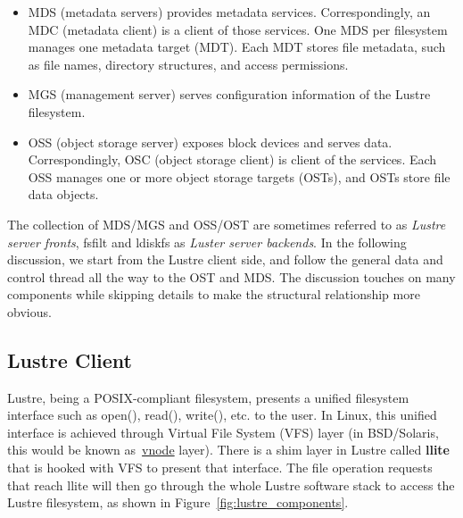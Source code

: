 %
%

\begin{itemize}

\item MDS (metadata servers) provides metadata services. Correspondingly, an
MDC (metadata client) is a client of those services. One MDS per filesystem
manages one metadata target (MDT). Each MDT stores file metadata, such as file
names, directory structures, and access permissions.

\item MGS (management server) serves configuration information of the Lustre
filesystem.

\item OSS (object storage server) exposes block devices and serves data.
Correspondingly, OSC (object storage client) is client of the services. Each
OSS manages one or more object storage targets (OSTs), and OSTs store file
data objects. 

\end{itemize}

The collection of MDS/MGS and OSS/OST are sometimes referred to as
\textit{Lustre server fronts}, fsfilt and ldiskfs as \textit{Luster server
backends}. In the following discussion, we start from the Lustre client side,
and follow the general data and control thread all the way to the OST and MDS.
The discussion touches on many components while skipping details to make the
structural relationship more obvious. 

\subsection*{Lustre Client}

Lustre, being a POSIX-compliant filesystem, presents a unified filesystem
interface such as open(), read(), write(), etc. to the user. In Linux, this
unified interface is achieved through Virtual File System (VFS) layer (in
BSD/Solaris, this would be known as~\url{vnode} layer). There is a shim layer
in Lustre called \textbf{llite} that is hooked with VFS to present that
interface. The file operation requests that reach llite will then go through
the whole Lustre software stack to access the Lustre filesystem, as shown in
Figure~\ref{fig:lustre_components}.

